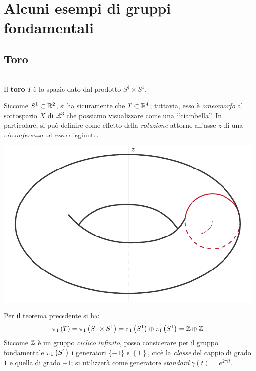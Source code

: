 \section{Alcuni esempi di gruppi fondamentali}
\subsection{Toro}
\begin{define}[Toro.]~{}\label{ciambella}\\
Il \textbf{toro} $T$ è lo spazio dato dal prodotto $S^1\times S^1$.
\end{define}
	Siccome $S^1\subset\mathbb{R}^2$, si ha sicuramente che $T\subset \mathbb{R}^4$; tuttavia, esso è \textit{omeomorfo} al sottospazio $X$ di $\mathbb{R}^3$ che possiamo visualizzare come una ‘‘ciambella''.
	In particolare, si può definire come effetto della \textit{rotazione} attorno all'asse $z$ di una \textit{circonferenza} ad esso disgiunto.\\
	\begin{minipage}{.42\linewidth}
		\begin{center}
				\includegraphics[trim=0cm 0cm 0cm 0cm,clip,scale=0.45]{images/torusalone.pdf}
		\end{center}

	\end{minipage}
	\begin{minipage}{.57\linewidth}
	Per il teorema precedente si ha:
\begin{equation*}
	\gruf{T}{\ }=\gruf{S^1\times S^1}{\ }=\gruf{S^1}{\ }\oplus\gruf{S^1}{\ }=\integerset\oplus\integerset
\end{equation*}
Siccome $\mathbb{Z}$ è un gruppo \textit{ciclico infinito}, posso considerare per il gruppo fondamentale $\gruf{S^1}{\ }$ i generatori $\{-1\}$ e $\left\{1\right\}$, cioè la \textit{classe} del cappio di grado $1$ e quella di grado $-1$; si utilizzerà come generatore \textit{standard} $\gamma(t)=e^{2\pi i t}$.
	\end{minipage}\\
